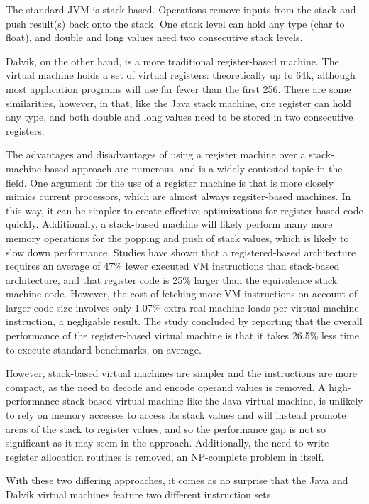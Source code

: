 The standard JVM is stack-based. Operations remove inputs from the stack and push result(s) back onto the stack. One stack level can hold any type (char to float), and double and long values need two consecutive stack levels.

Dalvik, on the other hand, is a more traditional register-based machine. The virtual machine holds a set of virtual registers: theoretically up to 64k, although most application programs will use far fewer than the first 256. There are some similarities, however, in that, like the Java stack machine, one register can hold any type, and both double and long values need to be stored in two consecutive registers.

The advantages and disadvantages of using a register machine over a stack-machine-based approach are numerous, and is a widely contested topic in the field. One argument for the use of a register machine is that is more closely mimics current processors, which are almost always regsiter-based machines. In this way, it can be simpler to create effective optimizations for register-based code quickly. Additionally, a stack-based machine will likely perform many more memory operations for the popping and push of stack values, which is likely to slow down performance. Studies have shown that a registered-based architecture requires an average of 47\% fewer executed VM instructions than stack-based architecture\cite{vmshowdown}, and that register code is 25\% larger than the equivalence stack machine code\cite{vmshowdown}. However, the cost of fetching more VM instructions on account of larger code size involves only 1.07\% extra real machine loads per virtual machine instruction\cite{vmshowdown}, a negligable result. The study concluded by reporting that the overall performance of the register-based virtual machine is that it takes 26.5\% less time to execute standard benchmarks, on average\cite{vmshowdown}.

However, stack-based virtual machines are simpler and the instructions are more compact, as the need to decode and encode operand values is removed. A high-performance stack-based virtual machine like the Java virtual machine, is unlikely to rely on memory accesses to access its stack values and will instead promote areas of the stack to register values, and so the performance gap is not so significant as it may seem in the \naive approach. Additionally, the need to write register allocation routines is removed, an NP-complete problem in itself\cite{chaitin82}.

With these two differing approaches, it comes as no surprise that the Java and Dalvik virtual machines feature two different instruction sets.
